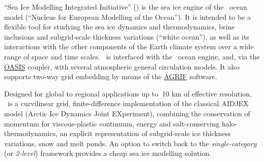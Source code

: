
``Sea Ice Modelling Integrated Initiative'' (\SIcube) is the sea ice engine of
the \NEMO\ ocean model (``Nucleus for European Modelling of the Ocean'').
It is intended to be a flexible tool for studying the sea ice dynamics and thermodynamics,
brine inclusions and subgrid-scale thickness variations (``white ocean''),
as well as its interactions with the other components of the Earth climate system over
a wide range of space and time scales.
\SIcube\ is interfaced with the \NEMO\ ocean engine, and,
via the \href{http://portal.enes.org/oasis}{OASIS} coupler,
with several atmospheric general circulation models.
It also supports two-way grid embedding by means of the \href{http://agrif.imag.fr}{AGRIF} software.

Designed for global to regional applications up to $~$10 km of effective resolution,
\SIcube\ is a curvilinear grid, finite-difference implementation of the classical AIDJEX model
(Arctic Ice Dynamics Joint EXperiment),
combining the conservation of momentum for viscous-plastic continuum,
energy and salt-conserving halo-thermodynamics,
an explicit representation of subgrid-scale ice thickness variations, snow and melt ponds.
An option to switch back to the \textit{single-category} (or \textit{2-level}) framework provides
a cheap sea ice modelling solution.
